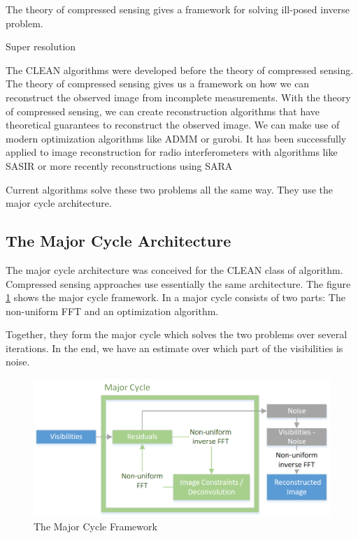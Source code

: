 The theory of compressed sensing gives a framework for solving ill-posed inverse problem. 

Super resolution




The CLEAN algorithms were developed before the theory of compressed sensing. The theory of compressed sensing gives us a framework on how we can reconstruct the observed image from incomplete measurements. With the theory of compressed sensing, we can create reconstruction algorithms that have theoretical guarantees to reconstruct the observed image. We can make use of modern optimization algorithms like ADMM or gurobi. It has been successfully applied to image reconstruction for radio interferometers with algorithms like SASIR \cite{starck2015starlet} or more recently reconstructions using SARA \cite{dabbech2018cygnus} \cite{birdi2018sparse}

Current algorithms solve these two problems all the same way. They use the major cycle architecture.


\subsection{The Major Cycle Architecture}
The major cycle architecture was conceived for the CLEAN class of algorithm. Compressed sensing approaches use essentially the same architecture. The figure \ref{intro:major} shows the major cycle framework. In a major cycle consists of two parts: The non-uniform FFT and an optimization algorithm.

Together, they form the major cycle which solves the two problems over several iterations. In the end, we have an estimate over which part of the visibilities is noise.

\begin{figure}
	\centering
	\vspace{-10pt}
	\includegraphics[width=1.0\linewidth]{./chapters/01.intro/Major-Minor.png}
	\caption{The Major Cycle Framework}
	\label{intro:major}
	\vspace{-10pt}
\end{figure}

